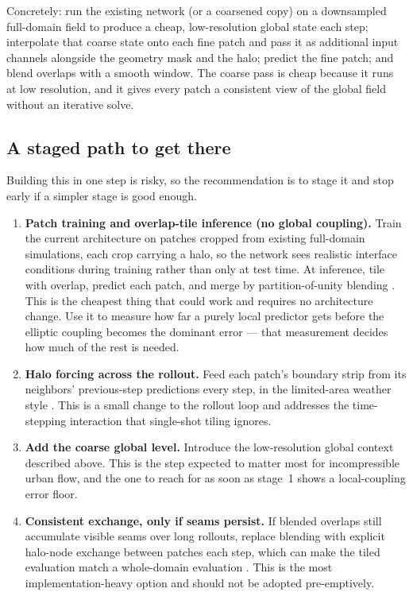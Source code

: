 \documentclass[11pt]{article}
\begin{document}
Concretely: run the existing network (or a coarsened copy) on a downsampled
full-domain field to produce a cheap, low-resolution global state each step;
interpolate that coarse state onto each fine patch and pass it as additional
input channels alongside the geometry mask and the halo; predict the fine patch;
and blend overlaps with a smooth window. The coarse pass is cheap because it runs
at low resolution, and it gives every patch a consistent view of the global field
without an iterative solve.

\subsection*{A staged path to get there}

Building this in one step is risky, so the recommendation is to stage it and stop
early if a simpler stage is good enough.

\begin{enumerate}[leftmargin=1.4em]
\item \textbf{Patch training and overlap-tile inference (no global coupling).}
Train the current architecture on patches cropped from existing full-domain
simulations, each crop carrying a halo, so the network sees realistic interface
conditions during training rather than only at test time. At inference, tile with
overlap, predict each patch, and merge by partition-of-unity blending
\cite{ronneberger2015unet,bartal2023multidiffusion}. This is the cheapest thing
that could work and requires no architecture change. Use it to measure how far a
purely local predictor gets before the elliptic coupling becomes the dominant
error --- that measurement decides how much of the rest is needed.
\item \textbf{Halo forcing across the rollout.} Feed each patch's boundary strip
from its neighbors' previous-step predictions every step, in the limited-area
weather style \cite{oskarsson2023neurallam,oskarsson2025mllam}. This is a small
change to the rollout loop and addresses the time-stepping interaction that
single-shot tiling ignores.
\item \textbf{Add the coarse global level.} Introduce the low-resolution global
context described above. This is the step expected to matter most for
incompressible urban flow, and the one to reach for as soon as stage~1 shows a
local-coupling error floor.
\item \textbf{Consistent exchange, only if seams persist.} If blended overlaps
still accumulate visible seams over long rollouts, replace blending with explicit
halo-node exchange between patches each step, which can make the tiled evaluation
match a whole-domain evaluation \cite{barwey2024consistentgnn}. This is the most
implementation-heavy option and should not be adopted pre-emptively.
\end{enumerate}
\end{document}
